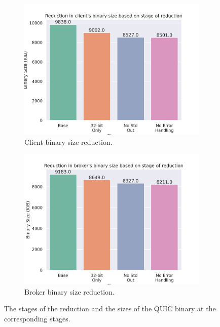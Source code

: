 \begin{figure}
    \begin{center}
        \begin{subfigure}[b]{0.6\textwidth}
            \includegraphics[width=1\linewidth]{images/quinn_binary_reduce_client.png}
            \caption{Client binary size reduction.}
            \label{fig:reduce_client}
        \end{subfigure}
        \begin{subfigure}[b]{0.6\textwidth}
            \includegraphics[width=1\linewidth]{images/quinn_binary_reduce_broker.png}
            \caption{Broker binary size reduction.}
            \label{fig:reduce_roker}
        \end{subfigure}
        \caption{The stages of the reduction and the sizes of the QUIC binary at the corresponding stages.}
        \label{fig:reduce}
    \end{center}
\end{figure}

